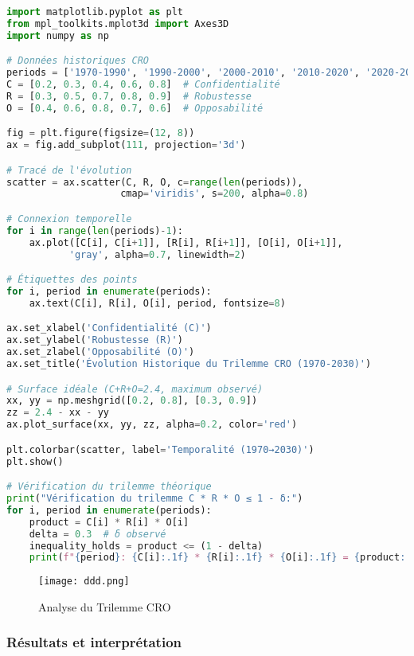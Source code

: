 \documentclass[12pt,a4paper]{article}
\begin{document}
\begin{lstlisting}[language=Python, caption=Analyse du trilemme CRO]
import matplotlib.pyplot as plt
from mpl_toolkits.mplot3d import Axes3D
import numpy as np

# Données historiques CRO
periods = ['1970-1990', '1990-2000', '2000-2010', '2010-2020', '2020-2030']
C = [0.2, 0.3, 0.4, 0.6, 0.8]  # Confidentialité
R = [0.3, 0.5, 0.7, 0.8, 0.9]  # Robustesse  
O = [0.4, 0.6, 0.8, 0.7, 0.6]  # Opposabilité

fig = plt.figure(figsize=(12, 8))
ax = fig.add_subplot(111, projection='3d')

# Tracé de l'évolution
scatter = ax.scatter(C, R, O, c=range(len(periods)), 
                    cmap='viridis', s=200, alpha=0.8)

# Connexion temporelle
for i in range(len(periods)-1):
    ax.plot([C[i], C[i+1]], [R[i], R[i+1]], [O[i], O[i+1]], 
           'gray', alpha=0.7, linewidth=2)

# Étiquettes des points
for i, period in enumerate(periods):
    ax.text(C[i], R[i], O[i], period, fontsize=8)

ax.set_xlabel('Confidentialité (C)')
ax.set_ylabel('Robustesse (R)')
ax.set_zlabel('Opposabilité (O)')
ax.set_title('Évolution Historique du Trilemme CRO (1970-2030)')

# Surface idéale (C+R+O=2.4, maximum observé)
xx, yy = np.meshgrid([0.2, 0.8], [0.3, 0.9])
zz = 2.4 - xx - yy
ax.plot_surface(xx, yy, zz, alpha=0.2, color='red')

plt.colorbar(scatter, label='Temporalité (1970→2030)')
plt.show()

# Vérification du trilemme théorique
print("Vérification du trilemme C * R * O ≤ 1 - δ:")
for i, period in enumerate(periods):
    product = C[i] * R[i] * O[i]
    delta = 0.3  # δ observé
    inequality_holds = product <= (1 - delta)
    print(f"{period}: {C[i]:.1f} * {R[i]:.1f} * {O[i]:.1f} = {product:.3f} ≤ {1-delta:.1f} : {inequality_holds}")
\end{lstlisting}

\begin{figure}[H]
    \centering
    \texttt{[image: ddd.png]}
    \caption{Analyse du Trilemme CRO}
    \label{fig:evolution_regimes}
\end{figure}

\subsubsection{Résultats et interprétation}
\end{document}
